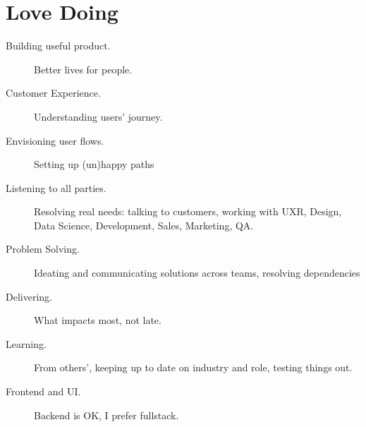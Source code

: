 \section*{Love Doing}

\begin{description}
\item[Building useful product.] Better lives for people. %
\item[Customer Experience.]
Understanding users' journey.
\item[Envisioning user flows.] Setting up (un)happy paths
\item[Listening to all parties.] Resolving real needs: %
talking to customers,
working with UXR,
Design,
Data Science,
Development,
Sales,
Marketing,
QA.
\item[Problem Solving.]%
Ideating and communicating solutions across teams, resolving dependencies
\item[Delivering.] What impacts most, not late.
\item[Learning.]
From others', %
keeping up to date on industry and role, testing things out.
\item[Frontend and UI.] Backend is OK, I prefer fullstack.
\end{description}
